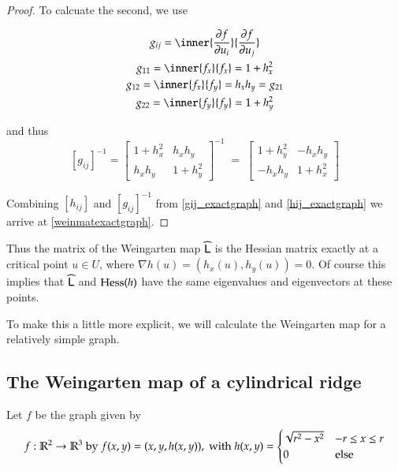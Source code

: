 \begin{proof}
			 To calcuate the second, we use
			 
			 
			 
			 \begin{equation}
			 \begin{gathered}
			 g_{ij} = \inner{\frac{\partial f}{\partial u_i}}{\frac{\partial f}{\partial u_j}} \\
			 g_{11} = \inner{f_x}{f_x} = 1 + h_x^2 \\
			 g_{12} = \inner{f_x}{f_y} = h_x h_y = g_{21} \\
			 g_{22} = \inner{f_y}{f_y} = 1 + h_y^2
			 \end{gathered}
			 \end{equation}
			 
			 and thus
			\begin{equation} \label{gij_exactgraph}		 
			[g_{ij}]^{-1} = \begin{bmatrix} 1 + h_x^2 & h_x h_y \\
						h_x h_y & 1 + h_y^2 \end{bmatrix}^{-1}
						\;=\;	\begin{bmatrix} 1 + h_y^2 & -h_x h_y \\
						-	h_x h_y & 1 + h_x^2 \end{bmatrix}
			\end{equation}
        	
        	Combining $[h_{ij}]$ and $[g_{ij}]^{-1}$ from \cref{gij_exactgraph} and \cref{hij_exactgraph}
        	we arrive at \cref{weinmatexactgraph}.
        	\end{proof}
        	
      Thus the matrix of the Weingarten map $\widehat{\mathsf{L}}$ is the Hessian matrix exactly at a critical point $u \in  U$, where $\nabla h(u) = (h_x(u), h_y(u)) = 0$. Of course this implies that $\widehat{\mathsf{L}}$ and $\mathrm{Hess}{(h)}$ have the same eigenvalues and eigenvectors at these points.
      
      To make this a little more explicit, we will calculate the Weingarten map for a relatively simple graph.
      
      \subsection{The Weingarten map of a cylindrical ridge}
      
      Let $f$ be the graph given by 
      \begin{equation}
	      f: \mathbb{R}^2 \to \mathbb{R}^3 \;\textrm{by}\; f(x,y) = (x,y,h(x,y)), \;\textrm{with}\;
	      h(x,y) = \begin{cases}
		      \sqrt{r^2 - x^2} & -r \le x \le r \\
		      0 & \textrm{else}
 	      \end{cases}
      \end{equation} 
      
